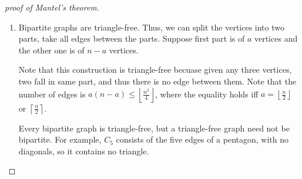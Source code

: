\begin{proof}[proof of Mantel's theorem]
    \hfill
    \begin{enumerate}[(1)]
        \item Bipartite graphs are triangle-free. Thus, we can split the vertices into two parts, take all edges between the parts. Suppose first part is of \(a\) vertices and the other one is of \(n - a\) vertices.
        \begin{center}
        \end{center}
        Note that this construction is triangle-free becuase given any three vertices, two fall in same part, and thus there is no edge between them. 
        Note that the number of edges is \(a(n - a) \le \left\lfloor \frac{n^2}{4} \right\rfloor\), where the equality holds iff \(a = \left\lfloor \frac{n}{2} \right\rfloor\) or \(\left\lceil \frac{n}{2} \right\rceil \).

        \begin{minipage}{\linewidth}
        \begin{note}
            Every bipartite graph is triangle-free, but a triangle-free graph need not be bipartite. For example, \(C_5\) consists of the five edges of a pentagon, with no diagonals, so it contains no triangle.


\end{note}
\end{minipage}
\end{enumerate}
\end{proof}
